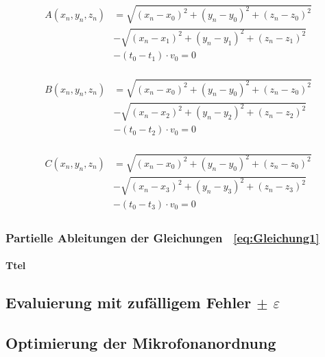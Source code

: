 \begin{align}
\begin{split}
A(x_{n},y_{n},z_{n})  &=  \sqrt{(x_{n}- x_{0})^{2} + (y_{n} - y_{0})^{2} + (z_{n} - z_{0})^{2}} \\& - \sqrt{(x_{n}- x_{1})^{2} + (y_{n} - y_{1})^{2} + (z_{n} - z_{1})^{2}} \\ & - (t_{0} - t_{1}) \cdot v_{0} = 0\label{Gleichung1}
\end{split}
\end{align}

\begin{align}
\begin{split}
B(x_{n},y_{n},z_{n})  &=  \sqrt{(x_{n}- x_{0})^{2} + (y_{n} - y_{0})^{2} + (z_{n} - z_{0})^{2}} \\& - \sqrt{(x_{n}- x_{2})^{2} + (y_{n} - y_{2})^{2} + (z_{n} - z_{2})^{2}} \\ & - (t_{0} - t_{2}) \cdot v_{0} = 0
\end{split}
\end{align}

\begin{align}
\begin{split}
C(x_{n},y_{n},z_{n})  &=  \sqrt{(x_{n}- x_{0})^{2} + (y_{n} - y_{0})^{2} + (z_{n} - z_{0})^{2}} \\& - \sqrt{(x_{n}- x_{3})^{2} + (y_{n} - y_{3})^{2} + (z_{n} - z_{3})^{2}} \\ & - (t_{0} - t_{3}) \cdot v_{0} = 0\label{eq:Gleichung3}
\end{split}
\end{align}

\subsubsection{Partielle Ableitungen der Gleichungen ~\eqref{eq:Gleichung1}}
\paragraph{Ttel}







\subsection{Evaluierung mit zufälligem Fehler $\pm$ $\varepsilon$ }
\subsection{Optimierung der Mikrofonanordnung}
